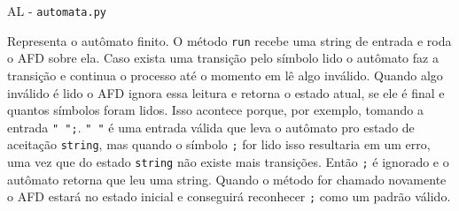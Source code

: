 \documentclass[10pt]{beamer}
\begin{document}
\begin{frame}{AL - \texttt{automata.py}}

    Representa o autômato finito. O método \texttt{run} recebe uma string de
    entrada e roda o AFD sobre ela. Caso exista uma transição pelo símbolo lido
    o autômato faz a transição e continua o processo até o momento em lê algo
    inválido. Quando algo inválido é lido o AFD ignora essa leitura e retorna
    o estado atual, se ele é final e quantos símbolos foram lidos. Isso
    acontece porque, por exemplo, tomando a entrada \texttt{" ";}. \texttt{" "}
    é uma entrada válida que leva o autômato pro estado de aceitação
    \texttt{string}, mas quando o símbolo \texttt{;} for lido isso resultaria
    em um erro, uma vez que do estado \texttt{string} não existe mais
    transições. Então \texttt{;} é ignorado e o autômato retorna que leu uma
    string. Quando o método for chamado novamente o AFD estará no estado
    inicial e conseguirá reconhecer \texttt{;} como um padrão válido.

\end{frame}
\end{document}
